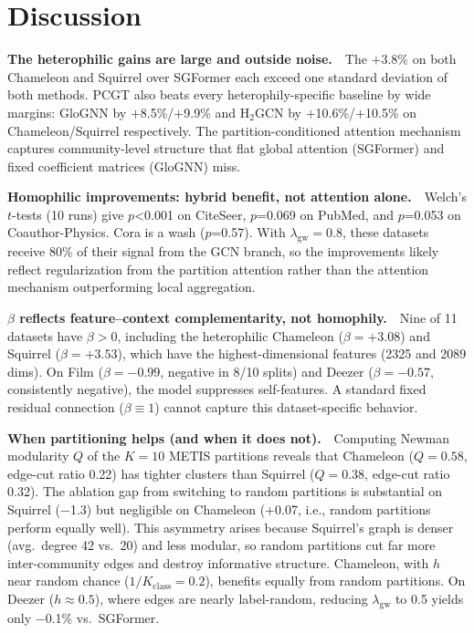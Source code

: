 \documentclass[manuscript, screen, review, anonymous]{acmart}
\begin{document}
\section{Discussion}
\label{sec:discussion}

\textbf{The heterophilic gains are large and outside noise.}~~The $+$3.8\% on both Chameleon and Squirrel over SGFormer each exceed one standard deviation of both methods. PCGT also beats every heterophily-specific baseline by wide margins: GloGNN by $+$8.5\%/$+$9.9\% and H$_2$GCN by $+$10.6\%/$+$10.5\% on Chameleon/Squirrel respectively. The partition-conditioned attention mechanism captures community-level structure that flat global attention (SGFormer) and fixed coefficient matrices (GloGNN) miss.

\textbf{Homophilic improvements: hybrid benefit, not attention alone.}~~Welch's $t$-tests (10 runs) give $p$<0.001 on CiteSeer, $p$=0.069 on PubMed, and $p$=0.053 on Coauthor-Physics. Cora is a wash ($p$=0.57). With $\lambda_{\text{gw}}=0.8$, these datasets receive 80\% of their signal from the GCN branch, so the improvements likely reflect regularization from the partition attention rather than the attention mechanism outperforming local aggregation.

\textbf{$\beta$ reflects feature--context complementarity, not homophily.}~~Nine of 11 datasets have $\beta > 0$, including the heterophilic Chameleon ($\beta = +3.08$) and Squirrel ($\beta = +3.53$), which have the highest-dimensional features (2325 and 2089 dims). On Film ($\beta = -0.99$, negative in 8/10 splits) and Deezer ($\beta = -0.57$, consistently negative), the model suppresses self-features. A standard fixed residual connection ($\beta \equiv 1$) cannot capture this dataset-specific behavior.

\textbf{When partitioning helps (and when it does not).}~~Computing Newman modularity $Q$ of the $K\!=\!10$ METIS partitions reveals that Chameleon ($Q=0.58$, edge-cut ratio 0.22) has tighter clusters than Squirrel ($Q=0.38$, edge-cut ratio 0.32). The ablation gap from switching to random partitions is substantial on Squirrel ($-$1.3) but negligible on Chameleon ($+$0.07, i.e., random partitions perform equally well). This asymmetry arises because Squirrel's graph is denser (avg.\ degree 42 vs.\ 20) and less modular, so random partitions cut far more inter-community edges and destroy informative structure. Chameleon, with $h$ near random chance ($1/K_{\text{class}} = 0.2$), benefits equally from random partitions. On Deezer ($h \approx 0.5$), where edges are nearly label-random, reducing $\lambda_{\text{gw}}$ to 0.5 yields only $-$0.1\% vs.\ SGFormer.
\end{document}

